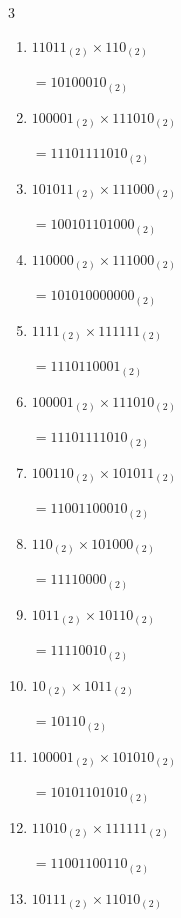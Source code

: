 \begin{multicols}{3}
\begin{enumerate}
        $=10000111000_{(2)}$

  \item $11011_{(2)} \times 110_{(2)}$

        $=10100010_{(2)}$

\columnbreak %

  \item $100001_{(2)} \times 111010_{(2)}$

        $=11101111010_{(2)}$

  \item $101011_{(2)} \times 111000_{(2)}$

        $=100101101000_{(2)}$

  \item $110000_{(2)} \times 111000_{(2)}$

        $=101010000000_{(2)}$

  \item $1111_{(2)} \times 111111_{(2)}$

        $=1110110001_{(2)}$

  \item $100001_{(2)} \times 111010_{(2)}$

        $=11101111010_{(2)}$

\columnbreak %

\resetques

  \item $100110_{(2)} \times 101011_{(2)}$

        $=11001100010_{(2)}$

  \item $110_{(2)} \times 101000_{(2)}$

        $=11110000_{(2)}$

  \item $1011_{(2)} \times 10110_{(2)}$

        $=11110010_{(2)}$

  \item $10_{(2)} \times 1011_{(2)}$

        $=10110_{(2)}$

  \item $100001_{(2)} \times 101010_{(2)}$

        $=10101101010_{(2)}$

\columnbreak %

  \item $11010_{(2)} \times 111111_{(2)}$

        $=11001100110_{(2)}$

  \item $10111_{(2)} \times 11010_{(2)}$


\end{enumerate}
\end{multicols}
